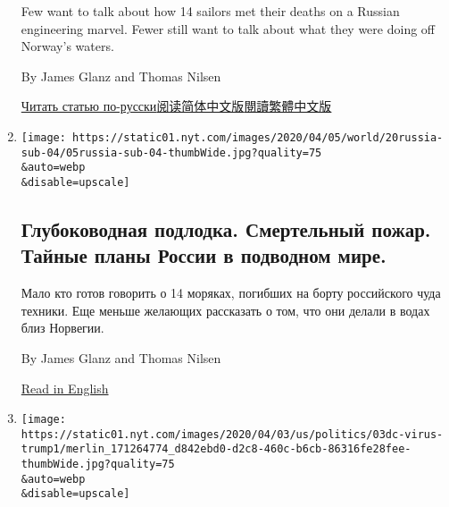 \begin{enumerate}
  Few want to talk about how 14 sailors met their deaths on a Russian
  engineering marvel. Fewer still want to talk about what they were
  doing off Norway's waters.

  By James Glanz and Thomas Nilsen

  \href{https://www.nytimes.com/ru/2020/04/20/world/europe/russia-submarine-losharik-norway.html}{Читать
  статью
  по-русски}\href{https://cn.nytimes.com/world/20200421/russian-submarine-fire-losharik/}{阅读简体中文版}\href{https://cn.nytimes.com/world/20200421/russian-submarine-fire-losharik/zh-hant/}{閱讀繁體中文版}
\item
  \href{/ru/2020/04/20/world/europe/russia-submarine-losharik-norway.html}{}

  \texttt{[image: https://static01.nyt.com/images/2020/04/05/world/20russia-sub-04/05russia-sub-04-thumbWide.jpg?quality=75\\\&auto=webp\\\&disable=upscale]}

  \hypertarget{ux433ux43bux443ux431ux43eux43aux43eux432ux43eux434ux43dux430ux44f-ux43fux43eux434ux43bux43eux434ux43aux430-ux441ux43cux435ux440ux442ux435ux43bux44cux43dux44bux439-ux43fux43eux436ux430ux440-ux442ux430ux439ux43dux44bux435-ux43fux43bux430ux43dux44b-ux440ux43eux441ux441ux438ux438-ux432-ux43fux43eux434ux432ux43eux434ux43dux43eux43c-ux43cux438ux440ux435}{%
  \subsection{Глубоководная подлодка. Смертельный пожар. Тайные планы
  России в подводном
  мире.}\label{ux433ux43bux443ux431ux43eux43aux43eux432ux43eux434ux43dux430ux44f-ux43fux43eux434ux43bux43eux434ux43aux430-ux441ux43cux435ux440ux442ux435ux43bux44cux43dux44bux439-ux43fux43eux436ux430ux440-ux442ux430ux439ux43dux44bux435-ux43fux43bux430ux43dux44b-ux440ux43eux441ux441ux438ux438-ux432-ux43fux43eux434ux432ux43eux434ux43dux43eux43c-ux43cux438ux440ux435}}

  Мало кто готов говорить о 14 моряках, погибших на борту российского
  чуда техники. Еще меньше желающих рассказать о том, что они делали в
  водах близ Норвегии.

  By James Glanz and Thomas Nilsen

  \href{https://www.nytimes.com/2020/04/20/world/europe/russian-submarine-fire-losharik.html}{Read
  in English}
\item
  \href{/2020/04/03/us/politics/coronavirus-trump-medical-advisers.html}{}

  \texttt{[image: https://static01.nyt.com/images/2020/04/03/us/politics/03dc-virus-trump1/merlin\_171264774\_d842ebd0-d2c8-460c-b6cb-86316fe28fee-thumbWide.jpg?quality=75\\\&auto=webp\\\&disable=upscale]}


\end{enumerate}
